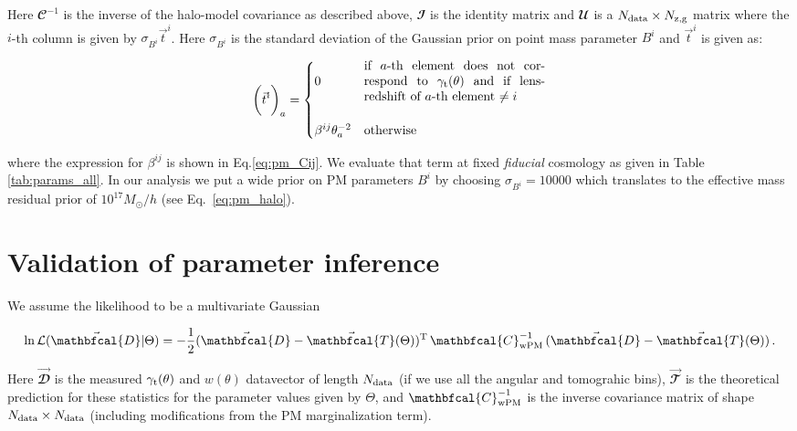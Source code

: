 \documentclass[aps, prd,twocolumn,superscriptaddress,nofootinbib,preprintnumbers]{revtex4-1}
\newcommand{\gammat}{\ensuremath{\gamma_{\rm t}(\theta)}}
\newcommand{\wtheta}{\ensuremath{w(\theta)}}
\begin{document}
Here ${\mathbfcal{C}}^{-1}$ is the inverse of the halo-model covariance as described above, $\mathbfcal{I}$ is the identity matrix and $\mathbfcal{U}$ is a $N_{\rm data} \times N_{\rm z,g}$ matrix where the $i$-th column is given by $\sigma_{B^i} \vec{t}^{i}$. Here $\sigma_{B^i}$ is the standard deviation of the  Gaussian prior on point mass parameter $B^i$ and $\vec{t}^{i}$ is given as:
\begin{linenomath*}
\begin{equation}
    \bigg(\vec{t}^{i} \bigg)_{a} = \begin{cases}
0 & \parbox{5cm}{if $a$-th element does not correspond to $\gammat$ and if lens-redshift of $a$-th element $\neq i$} \\  
\\
\beta^{ij}\theta_{a}^{-2} &\text{otherwise}
\end{cases}
\end{equation}
\end{linenomath*}
where the expression for $\beta^{ij}$ is shown in Eq.\ref{eq:pm_Cij}. We evaluate that term at fixed \textit{fiducial} cosmology as given in Table \ref{tab:params_all}. In our analysis we put a wide prior on PM parameters $B^i$ by choosing $\sigma_{B^i} = 10000$ which translates to the effective mass residual prior of $10^{17} M_{\odot}/h$ (see Eq.~\ref{eq:pm_halo}).


\section{Validation of parameter inference}
\label{sec:param_inf}
We assume the likelihood to be a multivariate Gaussian
\begin{linenomath*}
\begin{equation}
    \ln \mathcal{L}(\vec{\mathbfcal{D}}|\Theta) = -\frac{1}{2} (\vec{\mathbfcal{D}} - \vec{\mathbfcal{T}}(\Theta))^{\rm T} \, {\mathbfcal{C}}^{-1}_{\rm wPM} \,  (\vec{\mathbfcal{D}} - \vec{\mathbfcal{T}}(\Theta)) \,.
\end{equation}
\end{linenomath*}
Here $\vec{\mathbfcal{D}}$ is the measured $\gammat$ and $\wtheta$ datavector of length $N_{\rm data}$ (if we use all the angular and tomograhic bins), $\vec{\mathbfcal{T}}$ is the theoretical prediction for these statistics for the parameter values given by  $\Theta$, and ${\mathbfcal{C}}^{-1}_{\rm wPM}$ is the inverse covariance matrix of shape $N_{\rm data} \times N_{\rm data}$ (including modifications from the PM marginalization term).
\end{document}
